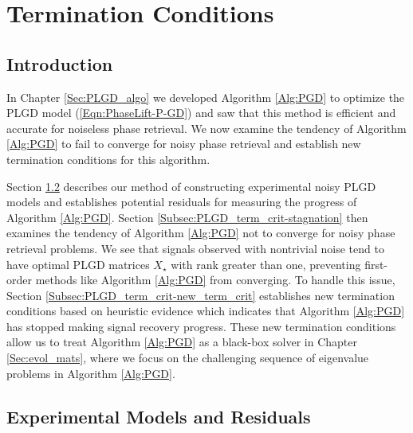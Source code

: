 \chapter{Termination Conditions}  \label{Sec:PLGD_term_crit}


\section{Introduction}	\label{Subsec:PLGD_term_crit-intro}


In Chapter \ref{Sec:PLGD_algo} we developed Algorithm \ref{Alg:PGD} to optimize the PLGD model (\ref{Eqn:PhaseLift-P-GD}) and saw that this method is efficient and accurate for noiseless phase retrieval.  
We now examine the tendency of Algorithm \ref{Alg:PGD} to fail to converge for noisy phase retrieval and establish new termination conditions for this algorithm.

Section \ref{Subsec:PLGD_term_crit-NOISY_MODELS_AND_RESIDUALS} describes our method of constructing experimental noisy PLGD models and establishes potential residuals for measuring the progress of Algorithm \ref{Alg:PGD}.
Section \ref{Subsec:PLGD_term_crit-stagnation} then examines the tendency of Algorithm \ref{Alg:PGD} not to converge for noisy phase retrieval problems.
We see that signals observed with nontrivial noise tend to have optimal PLGD matrices $X_\star$ with rank greater than one, preventing first-order methods like Algorithm \ref{Alg:PGD} from converging.  
To handle this issue, Section \ref{Subsec:PLGD_term_crit-new_term_crit} establishes new termination conditions based on heuristic evidence which indicates that Algorithm \ref{Alg:PGD} has stopped making signal recovery progress.  
These new termination conditions allow us to treat Algorithm \ref{Alg:PGD} as a black-box solver in Chapter \ref{Sec:evol_mats}, where we focus on the challenging sequence of eigenvalue problems in Algorithm \ref{Alg:PGD}.





\section{Experimental Models and Residuals} 		\label{Subsec:PLGD_term_crit-NOISY_MODELS_AND_RESIDUALS}



